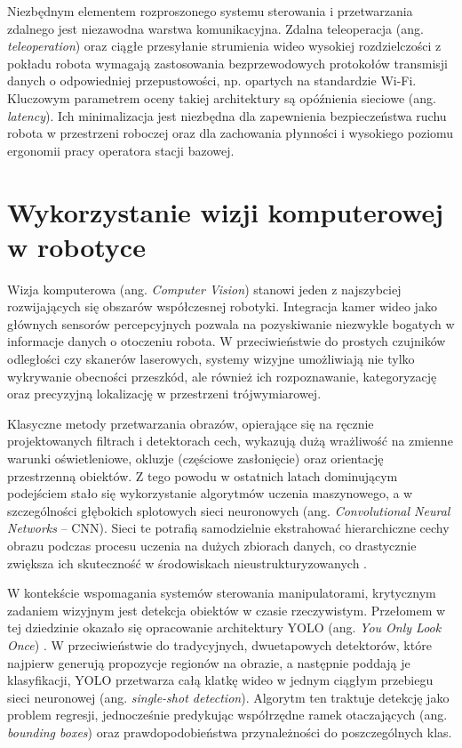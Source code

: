 \documentclass[11pt]{extreport}
\begin{document}
Niezbędnym elementem rozproszonego systemu sterowania i przetwarzania zdalnego jest niezawodna warstwa komunikacyjna. Zdalna teleoperacja (ang. \textit{teleoperation}) oraz ciągłe przesyłanie strumienia wideo wysokiej rozdzielczości z pokładu robota wymagają zastosowania bezprzewodowych protokołów transmisji danych o odpowiedniej przepustowości, np. opartych na standardzie Wi-Fi. Kluczowym parametrem oceny takiej architektury są opóźnienia sieciowe (ang. \textit{latency}). Ich minimalizacja jest niezbędna dla zapewnienia bezpieczeństwa ruchu robota w przestrzeni roboczej oraz dla zachowania płynności i wysokiego poziomu ergonomii pracy operatora stacji bazowej.

\section{Wykorzystanie wizji komputerowej w robotyce}

Wizja komputerowa (ang. \textit{Computer Vision}) stanowi jeden z najszybciej rozwijających się obszarów współczesnej robotyki. Integracja kamer wideo jako głównych sensorów percepcyjnych pozwala na pozyskiwanie niezwykle bogatych w informacje danych o otoczeniu robota. W przeciwieństwie do prostych czujników odległości czy skanerów laserowych, systemy wizyjne umożliwiają nie tylko wykrywanie obecności przeszkód, ale również ich rozpoznawanie, kategoryzację oraz precyzyjną lokalizację w przestrzeni trójwymiarowej. 

Klasyczne metody przetwarzania obrazów, opierające się na ręcznie projektowanych filtrach i detektorach cech, wykazują dużą wrażliwość na zmienne warunki oświetleniowe, okluzje (częściowe zasłonięcie) oraz orientację przestrzenną obiektów. Z tego powodu w ostatnich latach dominującym podejściem stało się wykorzystanie algorytmów uczenia maszynowego, a w szczególności głębokich splotowych sieci neuronowych (ang. \textit{Convolutional Neural Networks} -- CNN). Sieci te potrafią samodzielnie ekstrahować hierarchiczne cechy obrazu podczas procesu uczenia na dużych zbiorach danych, co drastycznie zwiększa ich skuteczność w środowiskach nieustrukturyzowanych \cite{goodfellow2016deep}.

W kontekście wspomagania systemów sterowania manipulatorami, krytycznym zadaniem wizyjnym jest detekcja obiektów w czasie rzeczywistym. Przełomem w tej dziedzinie okazało się opracowanie architektury YOLO (ang. \textit{You Only Look Once}) \cite{redmon2016you}. W przeciwieństwie do tradycyjnych, dwuetapowych detektorów, które najpierw generują propozycje regionów na obrazie, a następnie poddają je klasyfikacji, YOLO przetwarza całą klatkę wideo w jednym ciągłym przebiegu sieci neuronowej (ang. \textit{single-shot detection}). Algorytm ten traktuje detekcję jako problem regresji, jednocześnie predykując współrzędne ramek otaczających (ang. \textit{bounding boxes}) oraz prawdopodobieństwa przynależności do poszczególnych klas.
\end{document}
